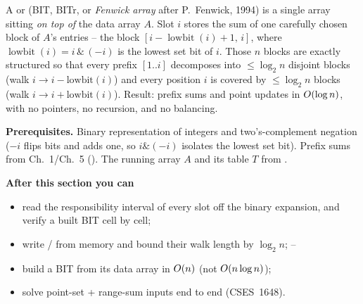 \begin{topicintro}
A  or  (BIT, BITr, or
\emph{Fenwick array} after P.\ Fenwick, 1994) is a single array 
sitting \emph{on top of} the data array \(A\).  Slot \(i\) stores the sum of
one carefully chosen block of \(A\)'s entries -- the block
\([i-\operatorname{lowbit}(i)+1,\,i]\), where
\(\operatorname{lowbit}(i)=i\,\&\,(-i)\) is the lowest set bit of \(i\).
Those \(n\) blocks are exactly structured so that every prefix
\([1..i]\) decomposes into \(\le\log_2 n\) disjoint blocks (walk
\(i\to i-\text{lowbit}(i)\)) and every position \(i\) is covered by
\(\le\log_2 n\) blocks (walk \(i\to i+\text{lowbit}(i)\)).  Result: prefix
sums and point updates in \(O(\log n)\), with no pointers, no recursion,
and no balancing.

\textbf{Prerequisites.} Binary representation of integers and two's-complement
negation (\(-i\) flips bits and adds one, so \(i\&(-i)\) isolates the lowest
set bit).  Prefix sums from Ch.~1/Ch.~5 ().  The running
array \(A\) and its table \(T\) from .

\textbf{After this section you can}
\begin{itemize}[nosep]
  \item read the responsibility interval of every slot off the binary
        expansion, and verify a built BIT cell by cell; \hfill{}
  \item write / from memory and bound their walk
        length by \(\log_2 n\); \hfill{}--
  \item build a BIT from its data array in \(O(n)\) (not
        \(O(n\log n)\)); \hfill{}
  \item solve point-set + range-sum inputs end to end (CSES~1648). \hfill{}
\end{itemize}
\end{topicintro}

